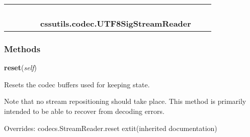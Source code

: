     \label{cssutils:codec:UTF8SigStreamReader}
\begin{tabular}{cccccccc}
\multicolumn{2}{r}{\settowidth{\BCL}{codecs.Codec}\multirow{2}{\BCL}{codecs.Codec}}
&&
&&
  \\\cline{3-3}
  &&\multicolumn{1}{c|}{}
&&
&&
  \\
\multicolumn{4}{r}{\settowidth{\BCL}{codecs.StreamReader}\multirow{2}{\BCL}{codecs.StreamReader}}
&&
  \\\cline{5-5}
  &&&&\multicolumn{1}{c|}{}
&&
  \\
&&&&\multicolumn{2}{l}{\textbf{cssutils.codec.UTF8SigStreamReader}}
\end{tabular}



  \subsubsection{Methods}

    \vspace{0.5ex}

\hspace{.8\funcindent}\begin{boxedminipage}{\funcwidth}

    \raggedright \textbf{reset}(\textit{self})

\setlength{\parskip}{2ex}
    Resets the codec buffers used for keeping state.

    Note that no stream repositioning should take place. This method is 
    primarily intended to be able to recover from decoding errors.

\setlength{\parskip}{1ex}
      Overrides: codecs.StreamReader.reset 	extit{(inherited documentation)}

    \end{boxedminipage}

    \vspace{0.5ex}

